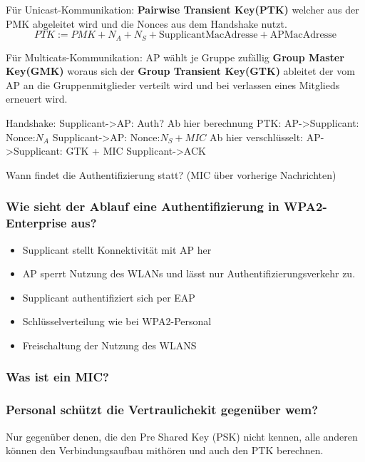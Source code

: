 	 
	
	Für Unicast-Kommunikation: \textbf{Pairwise Transient Key(PTK)} welcher aus der PMK abgeleitet wird und die Nonces aus dem Handshake nutzt.
	\begin{equation}
		PTK:= PMK + N_A + N_S +\text{SupplicantMacAdresse} + \text{APMacAdresse}
	\end{equation}
	
	Für Multicats-Kommunikation: AP wählt je Gruppe zufällig \textbf{Group Master Key(GMK)} woraus sich der \textbf{Group Transient Key(GTK)} ableitet der vom AP an die Gruppenmitglieder verteilt wird und bei verlassen eines Mitglieds erneuert wird.
	
	Handshake: \newline
	Supplicant->AP:	Auth? \newline
	Ab hier berechnung PTK: \newline
	AP->Supplicant:	Nonce:$N_A$ \newline
	Supplicant->AP:	Nonce:$N_S +MIC$ \newline
	Ab hier verschlüsselt: \newline
	AP->Supplicant: GTK + MIC \newline
	Supplicant->ACK \newline
	
	Wann findet die Authentifizierung statt? (MIC über vorherige Nachrichten)
	
	\subsubsection{Wie sieht der Ablauf eine Authentifizierung in WPA2-Enterprise aus?}
	\begin{itemize}
		\item Supplicant stellt Konnektivität mit AP her
		\item AP sperrt Nutzung des WLANs und lässt nur Authentifizierungsverkehr zu.		
		\item Supplicant authentifiziert sich per EAP
		\item Schlüsselverteilung wie bei WPA2-Personal
		\item Freischaltung der Nutzung des WLANS
	\end{itemize}
	\subsubsection{Was ist ein MIC?} %
		
%	
	\subsubsection{Personal schützt die Vertraulichekit gegenüber wem?}
	Nur gegenüber denen, die den Pre Shared Key (PSK) nicht kennen, alle anderen können den Verbindungsaufbau mithören und auch den PTK berechnen.
	
